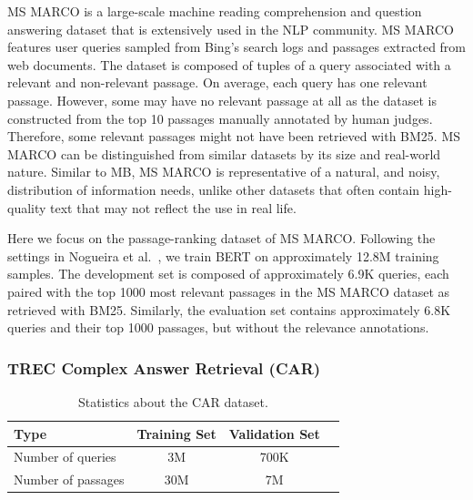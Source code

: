MS MARCO is a large-scale machine reading comprehension and question answering dataset that is extensively used in the NLP community.
MS MARCO~\cite{nguyen2016msmarco} features user queries sampled from Bing’s search logs and passages extracted from web documents.
The dataset is composed of tuples of a query associated with a relevant and non-relevant passage.
On average, each query has one relevant passage.
However, some may have no relevant passage at all as the dataset is constructed from the top 10 passages manually annotated by human judges.
Therefore, some relevant passages might not have been retrieved with BM25.
MS MARCO can be distinguished from similar datasets by its size and real-world nature.
Similar to MB, MS MARCO is representative of a natural, and noisy, distribution of information needs, unlike other datasets that often contain high-quality text that may not reflect the use in real life.

Here we focus on the passage-ranking dataset of MS MARCO.
Following the settings in Nogueira et al.~\cite{nogueira2019passage}, we train BERT on approximately 12.8M training samples.
The development set is composed of approximately 6.9K queries, each paired with the top 1000 most relevant passages in the MS MARCO dataset as retrieved with BM25.
Similarly, the evaluation set contains approximately 6.8K queries and their top 1000 passages, but without the relevance annotations.

\subsubsection{TREC Complex Answer Retrieval (CAR)}

\begin{table}[b!]
\vspace{0.2cm}
\centering
\begin{tabular}{lccc}
\toprule
\textbf{Type} \mbox{\hspace{0.5cm}} & \textbf{Training Set} \mbox{\hspace{1.0cm}} & \textbf{Validation Set} \mbox{\hspace{1.0cm}} \\
\toprule
Number of queries & 3M & 700K \\
Number of passages & 30M & 7M \\
\bottomrule
\end{tabular}
\vspace{0.2cm}
\caption{Statistics about the CAR dataset.}
\label{tab:car-stats}
\end{table}

